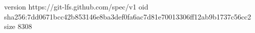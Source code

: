 version https://git-lfs.github.com/spec/v1
oid sha256:7dd0671bcc42b853146e8ba3def0fa6ac7d81e70013306ff12ab9b1737c56cc2
size 8308
